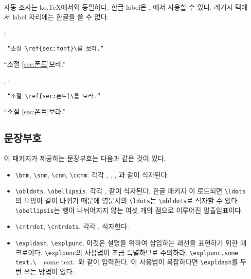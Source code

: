 \documentclass[
	12pt,
	a4paper,
	kosection,
	footnote,
	nobookmarks,
	microtype,
]{oblivoir}
\def\myREF#1#2{\ref{#1}}
\def\myREF#1#2{\ref{#2}}
\begin{document}
자동 조사는 ko.\TeX 에서와 동일하다.
한글 label은 \XeTeX, \LuaTeX 에서 사용할 수 있다.
레거시 텍에서 label 자리에는 한글을 쓸 수 없다. 

\medskip

\noindent{}:\\
\noindent\begin{minipage}{.45\textwidth}
\begin{verbatim}
 “소절 \ref{sec:font}\를 보라.”
\end{verbatim}
\end{minipage}\hfill
\begin{minipage}{.45\textwidth}
\hfill “소절 \myREF{sec:font}{sec:폰트}\를 보라.”
\end{minipage}

\noindent{}, :\\
\noindent\begin{minipage}{.45\textwidth}
\begin{verbatim}
 “소절 \ref{sec:폰트}\를 보라.”
\end{verbatim}
\end{minipage}\hfill
\begin{minipage}{.45\textwidth}
\hfill “소절 \myREF{sec:font}{sec:폰트}\를 보라.”
\end{minipage}

\subsection{문장부호}

이 패키지가 제공하는 문장부호는 다음과 같은 것이 있다.

\begin{itemize}
\item \verb|\bnm|, \verb|\snm|, \verb|\cnm|, \verb|\ccnm|. 각각 , , , 과 같이 식자된다.
\item \verb|\obldots|. \verb|\obellipsis|. 각각 \obldots,  같이 식자된다. 한글 패키지 \koTeX 이 로드되면 \verb|\ldots|의 모양이  같이 바뀌기 때문에 영문서의 \verb|\ldots|는 \verb|\obldots|로 식자할 \obldots 수 있다. \verb|\obellipsis|는 행이 나뉘어지지 않는 여섯 개의 점으로 이루어진 말출임표이다.
\item \verb|\cntrdot|, \verb|\cntrdots|. 각각 \cntrdot,  식자한다.
\item \verb|\expldash|, \verb|\explpunc|. 이것은 설명을 위하여 삽입하는 괘선\expldash 을 표현하기 위한 매크로이다. \verb|\explpunc|의 사용법이 조금 특별하므로 주의하라. \verb*|\explpunc.some text.\ | \explpunc.some text.\ 와 같이 입력한다. 이 사용법이 복잡하다면 \verb|\expldash|를 두 번 쓰는 방법이 있다.
\end{itemize}
\end{document}
